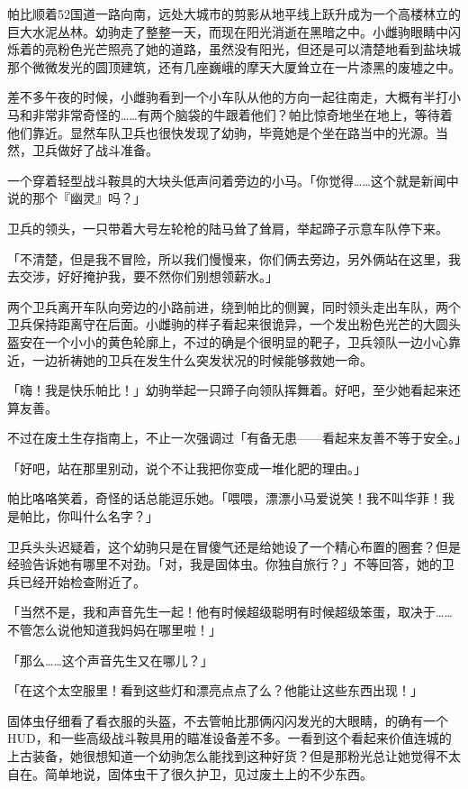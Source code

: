 \horizonline


帕比顺着52国道一路向南，远处大城市的剪影从地平线上跃升成为一个高楼林立的巨大水泥丛林。幼驹走了整整一天，而现在阳光消逝在黑暗之中。小雌驹眼睛中闪烁着的亮粉色光芒照亮了她的道路，虽然没有阳光，但还是可以清楚地看到盐块城那个微微发光的圆顶建筑，还有几座巍峨的摩天大厦耸立在一片漆黑的废墟之中。

差不多午夜的时候，小雌驹看到一个小车队从他的方向一起往南走，大概有半打小马和非常非常奇怪的……有两个脑袋的牛跟着他们？帕比惊奇地坐在地上，等待着他们靠近。显然车队卫兵也很快发现了幼驹，毕竟她是个坐在路当中的光源。当然，卫兵做好了战斗准备。

一个穿着轻型战斗鞍具的大块头低声问着旁边的小马。「你觉得……这个就是新闻中说的那个『幽灵』吗？」

卫兵的领头，一只带着大号左轮枪的陆马耸了耸肩，举起蹄子示意车队停下来。

「不清楚，但是我不冒险，所以我们慢慢来，你们俩去旁边，另外俩站在这里，我去交涉，好好掩护我，要不然你们别想领薪水。」

两个卫兵离开车队向旁边的小路前进，绕到帕比的侧翼，同时领头走出车队，两个卫兵保持距离守在后面。小雌驹的样子看起来很诡异，一个发出粉色光芒的大圆头盔安在一个小小的黄色轮廓上，不过的确是个很明显的靶子，卫兵领队一边小心靠近，一边祈祷她的卫兵在发生什么突发状况的时候能够救她一命。

「嗨！我是快乐帕比！」幼驹举起一只蹄子向领队挥舞着。好吧，至少她看起来还算友善。

不过在废土生存指南上，不止一次强调过「有备无患——看起来友善不等于安全。」

「好吧，站在那里别动，说个不让我把你变成一堆化肥的理由。」

帕比咯咯笑着，奇怪的话总能逗乐她。「喂喂，漂漂小马爱说笑！我不叫华菲！我是帕比，你叫什么名字？」

卫兵头头迟疑着，这个幼驹只是在冒傻气还是给她设了一个精心布置的圈套？但是经验告诉她有哪里不对劲。「对，我是固体虫。你独自旅行？」不等回答，她的卫兵已经开始检查附近了。

「当然不是，我和声音先生一起！他有时候超级聪明有时候超级笨蛋，取决于……不管怎么说他知道我妈妈在哪里啦！」

「那么……这个声音先生又在哪儿？」

「在这个太空服里！看到这些灯和漂亮点点了么？他能让这些东西出现！」

固体虫仔细看了看衣服的头盔，不去管帕比那俩闪闪发光的大眼睛，的确有一个HUD，和一些高级战斗鞍具用的瞄准设备差不多。一看到这个看起来价值连城的上古装备，她很想知道一个幼驹怎么能找到这种好货？但是那粉光总让她觉得不太自在。简单地说，固体虫干了很久护卫，见过废土上的不少东西。

